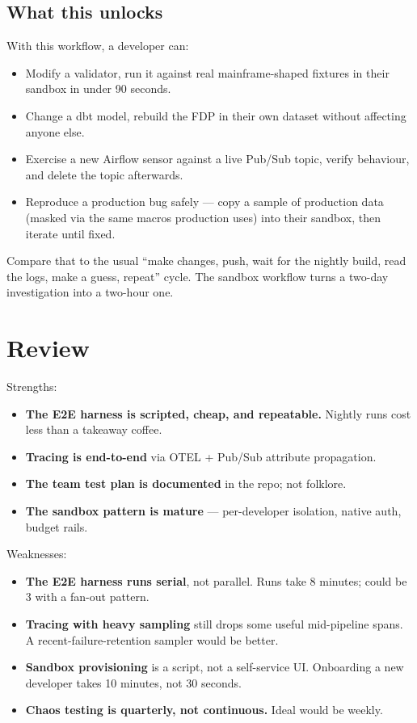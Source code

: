 \documentclass[
  11pt,
  british,
  oneside]{book}
\providecommand{\tightlist}{%
  \setlength{\itemsep}{0pt}\setlength{\parskip}{0pt}}
\begin{document}
\hypertarget{what-this-unlocks}{%
\subsection{What this unlocks}\label{what-this-unlocks}}

With this workflow, a developer can:

\begin{itemize}
\tightlist
\item
  Modify a validator, run it against real mainframe-shaped fixtures in
  their sandbox in under 90 seconds.
\item
  Change a dbt model, rebuild the FDP in their own dataset without
  affecting anyone else.
\item
  Exercise a new Airflow sensor against a live Pub/Sub topic, verify
  behaviour, and delete the topic afterwards.
\item
  Reproduce a production bug safely --- copy a sample of production data
  (masked via the same macros production uses) into their sandbox, then
  iterate until fixed.
\end{itemize}

Compare that to the usual ``make changes, push, wait for the nightly
build, read the logs, make a guess, repeat'' cycle. The sandbox workflow
turns a two-day investigation into a two-hour one.

\hypertarget{review-1}{%
\section{Review}\label{review-1}}

Strengths:

\begin{itemize}
\tightlist
\item
  \textbf{The E2E harness is scripted, cheap, and repeatable.} Nightly
  runs cost less than a takeaway coffee.
\item
  \textbf{Tracing is end-to-end} via OTEL + Pub/Sub attribute
  propagation.
\item
  \textbf{The team test plan is documented} in the repo; not folklore.
\item
  \textbf{The sandbox pattern is mature} --- per-developer isolation,
  native auth, budget rails.
\end{itemize}

Weaknesses:

\begin{itemize}
\tightlist
\item
  \textbf{The E2E harness runs serial}, not parallel. Runs take 8
  minutes; could be 3 with a fan-out pattern.
\item
  \textbf{Tracing with heavy sampling} still drops some useful
  mid-pipeline spans. A recent-failure-retention sampler would be
  better.
\item
  \textbf{Sandbox provisioning} is a script, not a self-service UI.
  Onboarding a new developer takes 10 minutes, not 30 seconds.
\item
  \textbf{Chaos testing is quarterly, not continuous.} Ideal would be
  weekly.
\end{itemize}
\end{document}
